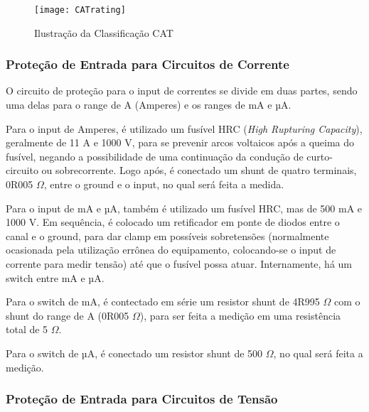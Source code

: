    \begin{figure}[htb]%
        \caption{Ilustração da Classificação CAT}%
        \label{fig:CATrating}%
        \texttt{[image: CATrating]}%
    \end{figure}


    
        \subsubsection{Proteção de Entrada para Circuitos de Corrente}\label{subsec:protecaoCorrente}

        O circuito de proteção para o input de correntes se divide em duas partes, sendo uma delas para o range de A (Amperes) e os ranges de mA e µA.

	    Para o input de Amperes, é utilizado um fusível \gls{HRC} (\textit{High Rupturing Capacity}), geralmente de 11 A e 1000 V, para se prevenir arcos voltaicos após a queima do fusível, negando a possibilidade de uma continuação da condução de curto-circuito ou sobrecorrente. Logo após, é conectado um shunt de quatro terminais, 0R005 $\Omega$, entre o ground e o input, no qual será feita a medida.

	    Para o input de mA e µA, também é utilizado um fusível \gls{HRC}, mas de 500 mA e 1000 V. Em sequência, é colocado um retificador em ponte de diodos entre o canal e o ground, para dar clamp em possíveis sobretensões (normalmente ocasionada pela utilização errônea do equipamento, colocando-se o input de corrente para medir tensão) até que o fusível possa atuar. Internamente, há um switch entre mA e µA. 

        Para o switch de mA, é contectado em série um resistor shunt de 4R995 $\Omega$ com o shunt do range de A (0R005 $\Omega$), para ser feita a medição em uma resistência total de 5 $\Omega$.

        Para o switch de µA, é conectado um resistor shunt de 500 $\Omega$, no qual será feita a medição. %

        \subsubsection{Proteção de Entrada para Circuitos de Tensão}\label{subsec:protecaoTensao}


